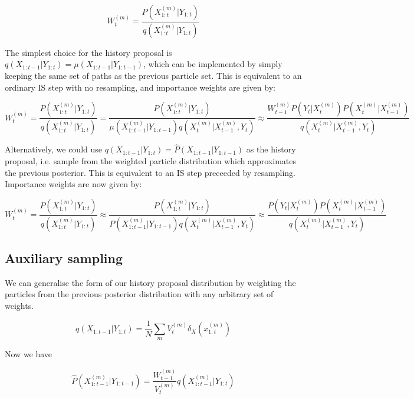 \begin{equation}
W_t^{(m)} = \frac{P(X_{1:t}^{(m)}|Y_{1:t})}{q(X_{1:t}^{(m)}|Y_{1:t})}
\label{eq:ImportanceWeights}
\end{equation}

The simplest choice for the history proposal is $q(X_{1:t-1}|Y_{1:t}) = \mu(X_{1:t-1}|Y_{1:t-1})$, which can be implemented by simply keeping the same set of paths as the previous particle set. This is equivalent to an ordinary IS step with no resampling, and importance weights are given by:

\begin{equation}
W_t^{(m)} = \frac{P(X_{1:t}^{(m)}|Y_{1:t})}{q(X_{1:t}^{(m)}|Y_{1:t})} = \frac{P(X_{1:t}^{(m)}|Y_{1:t})}{\mu(X_{1:t-1}^{(m)}|Y_{1:t-1}) q(X_{t}^{(m)}|X_{t-1}^{(m)}, Y_{t})} \approx \frac{W_{t-1}^{(m)} P(Y_t|X_t^{(m)})P(X_t^{(m)}|X_{t-1}^{(m)})}{q(X_t^{(m)}|X_{t-1}^{(m)}, Y_t)}
\label{eq:NoResampIW}
\end{equation}

Alternatively, we could use $q(X_{1:t-1}|Y_{1:t}) = \hat{P}(X_{1:t-1}|Y_{1:t-1})$ as the history proposal, i.e. sample from the weighted particle distribution which approximates the previous posterior. This is equivalent to an IS step preceeded by resampling. Importance weights are now given by:

\begin{equation}
W_t^{(m)} = \frac{P(X_{1:t}^{(m)}|Y_{1:t})}{q(X_{1:t}^{(m)}|Y_{1:t})} \approx \frac{P(X_{1:t}^{(m)}|Y_{1:t})}{P(X_{1:t-1}^{(m)}|Y_{1:t-1}) q(X_{t}^{(m)}|X_{t-1}^{(m)}, Y_{t})} \approx \frac{ P(Y_t|X_t^{(m)})P(X_t^{(m)}|X_{t-1}^{(m)})}{q(X_t^{(m)}|X_{t-1}^{(m)}, Y_t)}
\label{eq:NoResampIW}
\end{equation}

\subsection{Auxiliary sampling}

We can generalise the form of our history proposal distribution by weighting the particles from the previous posterior distribution with any arbitrary set of weights.

\begin{equation}
q(X_{1:t-1}|Y_{1:t}) = \frac{1}{N} \sum_m {V_t^{(m)} \delta_{X} (x_{1:t}^{(m)})}
\label{eq:AuxiliarySamplingProposal}
\end{equation}

Now we have

\begin{equation}
\hat{P}(X_{1:t-1}^{(m)}|Y_{1:t-1}) = \frac{W_{t-1}^{(m)}}{V_t^{(m)}} q(X_{1:t-1}^{(m)}|Y_{1:t})
\label{eq:}
\end{equation}

